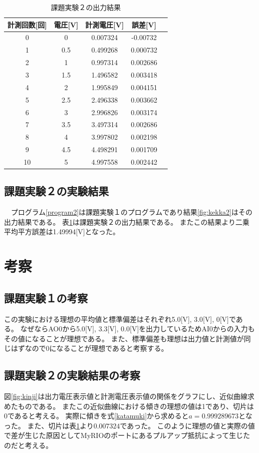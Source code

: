 \documentclass[11pt,dvipdfmx]{jarticle}
\begin{document}
				\begin{table}[h]
					\centering
					\caption{課題実験２の出力結果}
					\label{tab:task2}
					\begin{tabular}{|c|c|c|c|c|}
					\hline
					計測回数[回]&電圧[V]&計測電圧[V]&誤差[V]\\
					\hline
					0  & 0   & 0.007324 & -0.00732 \\
					1  & 0.5 & 0.499268 & 0.000732 \\
					2  & 1   & 0.997314 & 0.002686 \\
					3  & 1.5 & 1.496582 & 0.003418 \\
					4  & 2   & 1.995849 & 0.004151 \\
					5  & 2.5 & 2.496338 & 0.003662 \\
					6  & 3   & 2.996826 & 0.003174 \\
					7  & 3.5 & 3.497314 & 0.002686 \\
					8  & 4   & 3.997802 & 0.002198 \\
					9  & 4.5 & 4.498291 & 0.001709 \\
					10 & 5   & 4.997558 & 0.002442\\
					\hline
					\end{tabular}
					\end{table}

	\subsection{課題実験２の実験結果}
	　プログラム\ref{program2}は課題実験１のプログラムであり結果\ref{fig:kekka2}はその出力結果である。
		表\ref{tab:task2}は課題実験２の出力結果である。
		またこの結果より二乗平均平方誤差は1.49994[V]となった。
\section{考察}
	\subsection{課題実験１の考察}
	この実験における理想の平均値と標準偏差はそれぞれ5.0[V], 3.0[V], 0[V]である。
	なぜならAO0から5.0[V], 3.3[V], 0.0[V]を出力しているためAI0からの入力もその値になることが理想である。
	また、標準偏差も理想は出力値と計測値が同じはずなので0になることが理想であると考察する。

	\subsection{課題実験２の実験結果の考察}
	図\ref{fig:kinji}は出力電圧表示値と計測電圧表示値の関係をグラフにし、近似曲線求めたものである。
	またこの近似曲線における傾きの理想の値は1であり、切片は0であると考える。
	実際に傾きを式\ref{katamuki}から求めると$a=0.999289673$となった。
	また、切片は表\ref{tab:task2}より$0.007324$であった。
	このように理想の値と実際の値で差が生じた原因としてMyRIOのポートにあるプルアップ抵抗によって生じたのだと考える。
\end{document}

